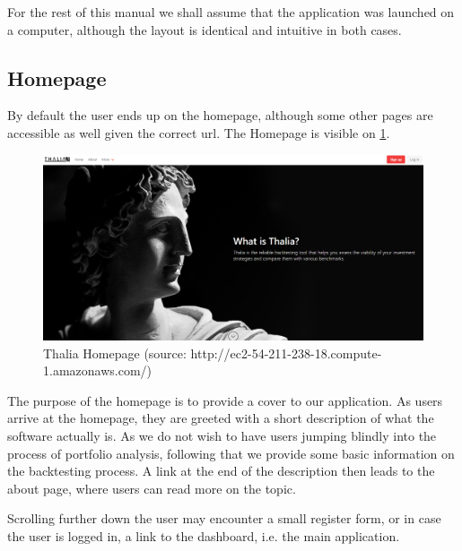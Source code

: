 \documentclass[main.tex]{subfiles}
\begin{document}
For the rest of this manual we shall assume that the application was launched on a computer, although the layout is identical and intuitive in both cases. 

\subsection{Homepage}

By default the user ends up on the homepage, although some other pages are accessible as well given the correct url. The Homepage is visible on \figurename{\ref{thalia_home}}.

\begin{figure}[H]
   \centering
   \includegraphics[width=\textwidth]{10Appendices/081User/081Pictures/homepage.png}
   \caption{Thalia Homepage (source: http://ec2-54-211-238-18.compute-1.amazonaws.com/)}
   \label{thalia_home}
\end{figure}

The purpose of the homepage is to provide a cover to our application. As users arrive at the homepage, they are greeted with a short description of what the software actually is.
As we do not wish to have users jumping blindly into the process of portfolio analysis, following that we provide some basic information on the backtesting process. A link at the end of the description then leads to the about page, where users can read more on the topic.

Scrolling further down the user may encounter a small register form, or in case the user is logged in, a link to the dashboard, i.e. the main application.
\end{document}
